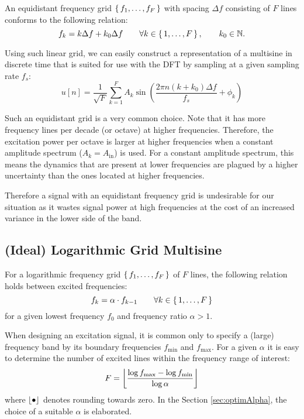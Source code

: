   An equidistant frequency grid $\set{f_1, \ldots, f_F}$ with spacing $\Delta f$
  consisting of $F$ lines conforms to the following relation:
  \begin{equation}
    f_k = k \Delta f + k_0 \Delta f
    \qquad \forall k \in \set{1,\ldots,F},
    \qquad k_0 \in \mathbb{N}
    \text{.}
  \label{eq:linGrid}
  \end{equation}
  
  Using such linear grid, we can easily construct a representation of a multisine
  in discrete time that is suited for use with the DFT by sampling at a given sampling rate $f_s$:
  \begin{equation}
     u \left[ n\right] = \frac{1}{\sqrt{F}}
     \sum_{k=1}^{F} 
       A_k 
       \sin 
         \left(\frac{2\pi n \left( k + k_0 \right) \Delta f}{f_s} + \phi_k \right)
    \label{eq:MultiSineDT}
  \end{equation}
  
  Such an equidistant grid is a very common choice.
  Note that it has more frequency lines per decade (or octave) at higher frequencies.
  Therefore, the excitation power per octave is larger at higher frequencies
  when a constant amplitude spectrum ($A_k = A_{\mathrm{in}}$) is used.
  For a constant amplitude spectrum, this means the dynamics that are present at lower frequencies are plagued by a higher uncertainty than the ones located at higher frequencies.
  
  Therefore a signal with an equidistant frequency grid is undesirable for
  our situation as it wastes signal power at high frequencies at the cost of an increased variance in the lower side of the band.
  
\subsection{(Ideal) Logarithmic Grid Multisine}
  For a logarithmic frequency grid $\set{f_1, \ldots, f_F}$ of $F$ lines,
  the following relation holds between excited frequencies:
  \begin{equation}
    f_k = \alpha \cdot f_{k-1}
    \qquad \forall k \in \set{1,\ldots,F}
  \label{eq:logGrid}
  \end{equation}
  for a given lowest frequency $f_0$ and frequency ratio $\alpha > 1$.

  When designing an excitation signal, it is common only to specify a (large) frequency band
  by its boundary frequencies $f_{\min}$ and $f_{\max}$.
  For a given $\alpha$ it is easy to determine the number of excited lines
  within the frequency range of interest:
    \begin{equation}
      F = \left\lfloor 
                  \frac{\log{f_{\max}} - \log{f_{\min}}}
                       {\log{\alpha}}
                 \right\rfloor
    \label{eq:logms:F}
    \end{equation}
  where $\left\lfloor \bullet \right\rfloor$ denotes rounding towards zero.
  In the Section \ref{sec:optimAlpha}, the choice of a suitable $\alpha$ is elaborated.

